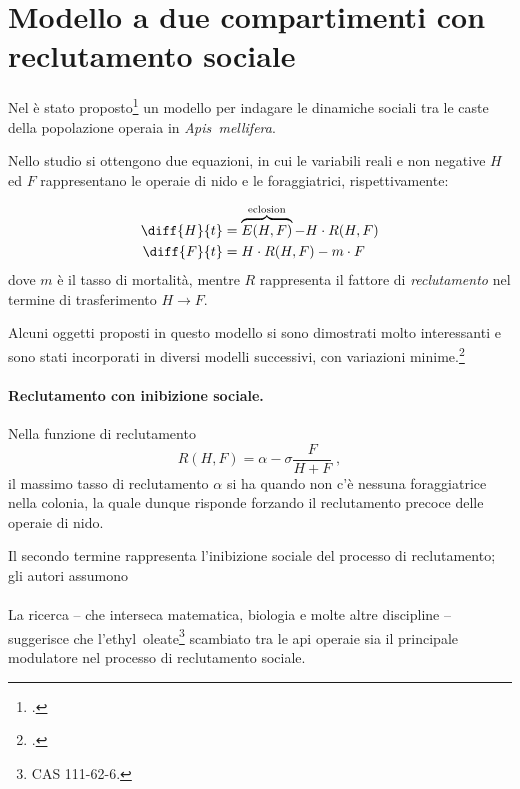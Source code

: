 \section[Modello a due compartimenti con reclutamento]{Modello a due compartimenti con reclutamento sociale}

Nel \citeyear{khoury2011} è stato proposto\footcite{khoury2011} un modello per indagare le dinamiche sociali
tra le caste della popolazione operaia in \emph{Apis~mellifera}.

Nello studio si ottengono due equazioni, in cui le variabili reali e non negative $H$ ed $F$ rappresentano
le operaie di nido e le foraggiatrici, rispettivamente:

\begin{align}
    \diff{H}{t} &= \overbrace{E(H,F)}^{\text{eclosion}}- H \cdot R(H,F) \label{eq:kh11h} \\
    \diff{F}{t} &= H \cdot R(H,F)  - m \cdot F \label{eq:kh11f}
\end{align}
dove $m$ è il tasso di mortalità, mentre $R$ rappresenta il fattore di \emph{reclutamento} nel termine di
trasferimento $H \to F$.

Alcuni oggetti proposti in questo modello si sono dimostrati molto interessanti e sono stati incorporati
in diversi modelli successivi, con variazioni minime.\footcite{ratti2017}

\paragraph{Reclutamento con inibizione sociale.}
Nella funzione di reclutamento
\begin{equation}
    \label{eq:Recr}
    R(H,F) = \alpha - \sigma \frac{F}{H+F} \; ,
\end{equation}
il massimo tasso di reclutamento $\alpha$ si ha quando non c'è nessuna foraggiatrice nella colonia, la quale
dunque risponde forzando il reclutamento precoce delle operaie di nido.

Il secondo termine rappresenta l'inibizione sociale del processo di reclutamento; gli autori assumono

\paragraph{}
La ricerca -- che interseca matematica, biologia e molte altre discipline -- suggerisce che
l'ethyl~oleate\footnote{CAS 111-62-6.} %
scambiato tra le api operaie sia il principale modulatore nel processo di reclutamento sociale.

